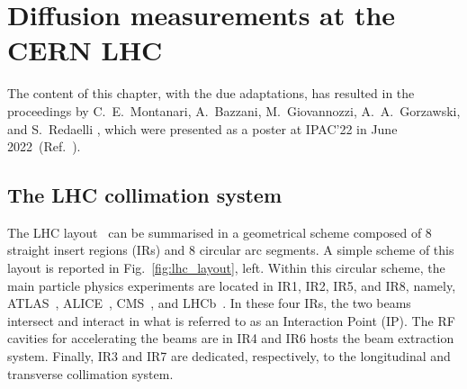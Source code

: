 \chapter{Diffusion measurements at the CERN LHC}
\noindent\textsf{The content of this chapter, with the due adaptations, has resulted in the proceedings by C.\ E.\ Montanari, A.\ Bazzani, M.\ Giovannozzi, A.\ A.\ Gorzawski, and S.\ Redaelli \textit{}, which were presented as a poster at IPAC'22 in June 2022~(Ref.~\cite{montanari:ipac22-mopost043}).}

\section{The LHC collimation system}\label{sec:collimation}

The LHC layout~\cite{Bruning:782076} can be summarised in a geometrical scheme composed of 8 straight insert regions (IRs) and 8 circular arc segments. A simple scheme of this layout is reported in Fig.~\ref{fig:lhc_layout}, left. Within this circular scheme, the main particle physics experiments are located in IR1, IR2, IR5, and IR8, namely, ATLAS~\cite{TheATLASCollaboration_2008}, ALICE~\cite{Alessandro:879894}, CMS~\cite{Chatrchyan:1129810}, and LHCb~\cite{Alves:1129809}. In these four IRs, the two beams intersect and interact in what is referred to as an Interaction Point (IP). The RF cavities for accelerating the beams are in IR4 and IR6 hosts the beam extraction system. Finally, IR3 and IR7 are dedicated, respectively, to the longitudinal and transverse collimation system.

